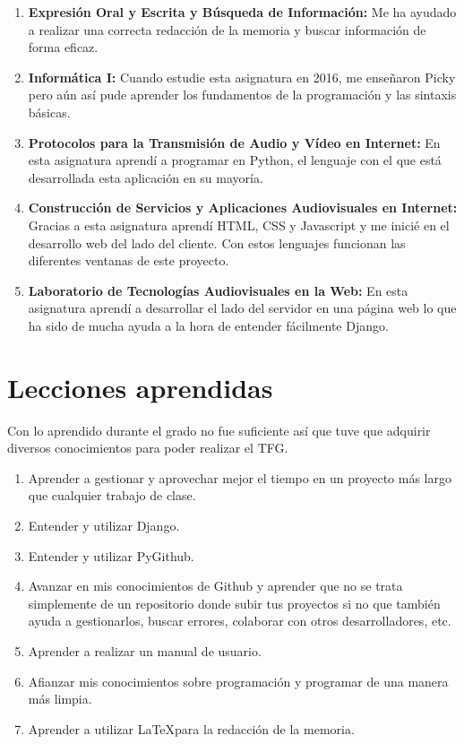\documentclass[a4paper, 12pt]{book}
\begin{document}
\begin{enumerate}
  \item \textbf{Expresión Oral y Escrita y Búsqueda de Información:} Me ha ayudado a realizar una correcta redacción de la memoria y buscar información de forma eficaz.
  \item \textbf{Informática I:} Cuando estudie esta asignatura en 2016, me enseñaron Picky pero aún así pude aprender los fundamentos de la programación y las sintaxis básicas.
  \item \textbf{Protocolos para la Transmisión de Audio y Vídeo en Internet:} En esta asignatura aprendí a programar en Python, el lenguaje con el que está desarrollada esta aplicación en su mayoría.
  \item \textbf{Construcción de Servicios y Aplicaciones Audiovisuales en Internet:} Gracias a esta asignatura aprendí HTML, CSS y Javascript y me inicié en el desarrollo web del lado del cliente. Con estos lenguajes funcionan las diferentes ventanas de este proyecto.
  \item \textbf{Laboratorio de Tecnologías Audiovisuales en la Web:} En esta asignatura aprendí a desarrollar el lado del servidor en una página web lo que ha sido de mucha ayuda a la hora de entender fácilmente Django.
\end{enumerate}


\section{Lecciones aprendidas}
\label{sec:lecciones_aprendidas}

Con lo aprendido durante el grado no fue suficiente así que tuve que adquirir diversos conocimientos para poder realizar el TFG.

\begin{enumerate}
  \item Aprender a gestionar y aprovechar mejor el tiempo en un proyecto más largo que cualquier trabajo de clase.
  \item Entender y utilizar Django.
  \item Entender y utilizar PyGithub.
  \item Avanzar en mis conocimientos de Github y aprender que no se trata simplemente de un repositorio donde subir tus proyectos si no que también ayuda a gestionarlos, buscar errores, colaborar con otros desarrolladores, etc.
  \item Aprender a realizar un manual de usuario.
  \item Afianzar mis conocimientos sobre programación y programar de una manera más limpia.
  \item Aprender a utilizar \LaTeX  para la redacción de la memoria.
\end{enumerate}
\end{document}
